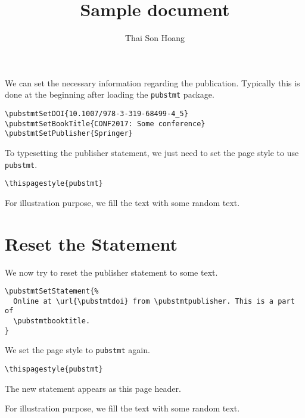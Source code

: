 \usepackage{pubstmt}

\usepackage{lipsum}


\title{Sample document}
\author{Thai Son Hoang}
\maketitle

We can set the necessary information regarding the publication.
Typically this is done at the beginning after loading the \verb|pubstmt| package.
\begin{verbatim}
\pubstmtSetDOI{10.1007/978-3-319-68499-4_5}
\pubstmtSetBookTitle{CONF2017: Some conference}
\pubstmtSetPublisher{Springer}
\end{verbatim}
To typesetting the publisher statement, we just need to set the page
style to use \verb|pubstmt|.
\begin{verbatim}
\thispagestyle{pubstmt}
\end{verbatim}
\thispagestyle{pubstmt}

For illustration purpose, we fill the text with some random text.
\begin{quote}
  \lipsum
\end{quote}

\section{Reset the Statement}
\label{sec:reset-statement}

We now try to reset the publisher statement to some text.
\begin{verbatim}
\pubstmtSetStatement{%
  Online at \url{\pubstmtdoi} from \pubstmtpublisher. This is a part of
  \pubstmtbooktitle.
}
\end{verbatim}
 We set the page style to \verb|pubstmt| again.
\begin{verbatim}
\thispagestyle{pubstmt}
\end{verbatim}
\thispagestyle{pubstmt}
The new statement appears as this page header.

For illustration purpose, we fill the text with some random text.
\begin{quote}
  \lipsum
\end{quote}


